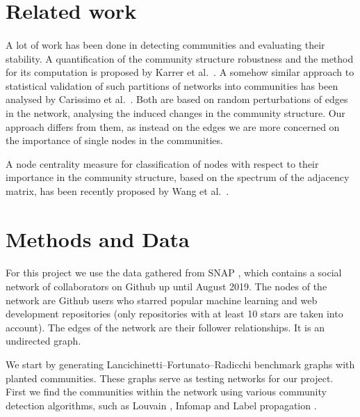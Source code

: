 \documentclass[9pt,twocolumn,twoside]{pnas-new}
\begin{document}
\section*{Related work}

\paragraph{} A lot of work has been done in detecting communities and evaluating their stability. A quantification of the community structure robustness and the method for its computation is proposed by Karrer et al.\ \cite{karrer-levina}. A somehow similar approach to statistical validation of such partitions of networks into communities has been analysed by Carissimo et al.\ \cite{carissimo}. Both are based on random perturbations of edges in the network, analysing the induced changes in the community structure. Our approach differs from them, as instead on the edges we are more concerned on the importance of single nodes in the communities. 

A node centrality measure for classification of nodes with respect to their importance in the community structure, based on the spectrum of the adjacency matrix, has been recently proposed by Wang et al.\ \cite{wang-yang-fan}.


\section*{Methods and Data}

\paragraph{}For this project we use the data gathered from SNAP \cite{github-graph}, 
which contains a social network of collaborators on Github up until August 2019. 
The nodes of the network are Github users who starred popular machine learning and web development repositories 
(only repositories with at least 10 stars are taken into account).
The edges of the network are their follower relationships. It is an undirected graph.

We start by generating Lancichinetti–Fortunato–Radicchi benchmark graphs with planted communities.
These graphs serve as testing networks for our project.
First we find the communities within the network using various community detection algorithms, such as Louvain \cite{louvain}, Infomap \cite{infomap} and Label propagation \cite{Raghavan-2007}. 
\end{document}
